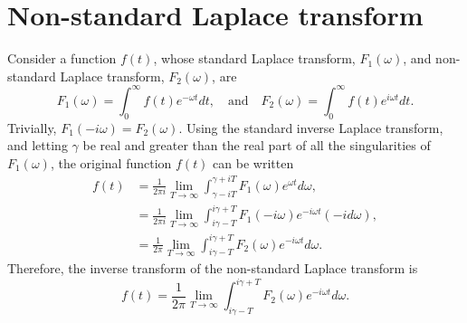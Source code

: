 \documentclass[12pt]{../style-files/ociamthesis}
\begin{document}
\section{Non-standard Laplace transform}\label{app: laplace trans}
Consider a function $f(t)$, whose standard Laplace transform, $F_1(\omega)$, and non-standard Laplace transform, $F_2(\omega)$, are
\begin{equation}
F_1(\omega) = \int_0^\infty f(t) e^{-\omega t} dt,
\quad \text{and} \quad
F_2(\omega) = \int_0^\infty f(t) e^{i\omega t} dt.
\end{equation}
Trivially, $F_1(-i\omega) = F_2(\omega)$. Using the standard inverse Laplace transform, and letting $\gamma$ be real and greater than the real part of all the singularities of $F_1(\omega)$, the original function $f(t)$ can be written
\begin{align}
f(t) & = \frac{1}{2\pi i} \lim_{T\to\infty} \int_{\gamma - iT}^{\gamma + iT} F_1(\omega)e^{\omega t} d\omega, \\
& = \frac{1}{2\pi i} \lim_{T\to\infty} \int_{i\gamma - T}^{i\gamma + T} F_1(-i\omega)e^{-i\omega t} (-id\omega), \\
& = \frac{1}{2\pi} \lim_{T\to\infty} \int_{i\gamma - T}^{i\gamma + T} F_2(\omega)e^{-i\omega t} d\omega.
\end{align}
Therefore, the inverse transform of the non-standard Laplace transform is
\begin{equation}
f(t) = \frac{1}{2\pi} \lim_{T\to\infty} \int_{i\gamma - T}^{i\gamma + T} F_2(\omega)e^{-i\omega t} d\omega.
\end{equation}
\end{document}
